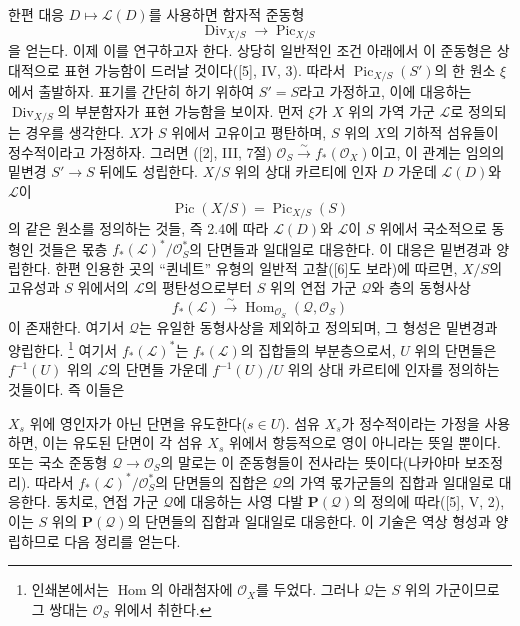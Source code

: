 한편 대응 $D\longmapsto\mathcal L(D)$를 사용하면 함자적 준동형
\begin{equation}
\operatorname{Div}_{X/S}\longrightarrow\operatorname{Pic}_{X/S}
\tag{+}
\end{equation}
을 얻는다. 이제 이를 연구하고자 한다. 상당히 일반적인 조건 아래에서 이
준동형은 상대적으로 표현 가능함이 드러날 것이다([5], IV, 3). 따라서
$\operatorname{Pic}_{X/S}(S')$의 한 원소 $\xi$에서 출발하자. 표기를
간단히 하기 위하여 $S'=S$라고 가정하고, 이에 대응하는
$\operatorname{Div}_{X/S}$의 부분함자가 표현 가능함을 보이자. 먼저
$\xi$가 $X$ 위의 가역 가군 $\mathcal L$로 정의되는 경우를 생각한다.
$X$가 $S$ 위에서 고유이고 평탄하며, $S$ 위의 $X$의 기하적 섬유들이
정수적이라고 가정하자. 그러면 ([2], III, 7절)
$\mathcal O_S\xrightarrow{\sim}f_*(\mathcal O_X)$이고, 이 관계는 임의의
밑변경 $S'\longrightarrow S$ 뒤에도 성립한다. $X/S$ 위의 상대 카르티에
인자 $D$ 가운데 $\mathcal L(D)$와 $\mathcal L$이
\[
\operatorname{Pic}(X/S)=\operatorname{Pic}_{X/S}(S)
\]
의 같은 원소를 정의하는 것들, 즉 2.4에 따라 $\mathcal L(D)$와
$\mathcal L$이 $S$ 위에서 국소적으로 동형인 것들은 몫층
$f_*(\mathcal L)^*/\mathcal O_S^*$의 단면들과 일대일로 대응한다. 이
대응은 밑변경과 양립한다. 한편 인용한 곳의 “퀸네트” 유형의 일반적
고찰([6]도 보라)에 따르면, $X/S$의 고유성과 $S$ 위에서의
$\mathcal L$의 평탄성으로부터 $S$ 위의 연접 가군 $\mathcal Q$와 층의
동형사상
\[
f_*(\mathcal L)\xrightarrow{\sim}
\operatorname{Hom}_{\mathcal O_S}(\mathcal Q,\mathcal O_S)
\]
이 존재한다. 여기서 $\mathcal Q$는 유일한 동형사상을 제외하고
정의되며, 그 형성은 밑변경과 양립한다.
\footnote{인쇄본에서는 $\operatorname{Hom}$의 아래첨자에
$\mathcal O_X$를 두었다. 그러나 $\mathcal Q$는 $S$ 위의 가군이므로
그 쌍대는 $\mathcal O_S$ 위에서 취한다.} 여기서
$f_*(\mathcal L)^*$는 $f_*(\mathcal L)$의 집합들의 부분층으로서, $U$
위의 단면들은 $f^{-1}(U)$ 위의 $\mathcal L$의 단면들 가운데
$f^{-1}(U)/U$ 위의 상대 카르티에 인자를 정의하는 것들이다. 즉 이들은

$X_s$ 위에 영인자가 아닌 단면을 유도한다($s\in U$). 섬유 $X_s$가
정수적이라는 가정을 사용하면, 이는 유도된 단면이 각 섬유 $X_s$ 위에서
항등적으로 영이 아니라는 뜻일 뿐이다. 또는 국소 준동형
$\mathcal Q\longrightarrow\mathcal O_S$의 말로는 이 준동형들이
전사라는 뜻이다(나카야마 보조정리). 따라서
$f_*(\mathcal L)^*/\mathcal O_S^*$의 단면들의 집합은 $\mathcal Q$의
가역 몫가군들의 집합과 일대일로 대응한다. 동치로, 연접 가군
$\mathcal Q$에 대응하는 사영 다발 $\mathbf P(\mathcal Q)$의 정의에
따라([5], V, 2), 이는 $S$ 위의 $\mathbf P(\mathcal Q)$의 단면들의
집합과 일대일로 대응한다. 이 기술은 역상 형성과 양립하므로 다음 정리를
얻는다.

